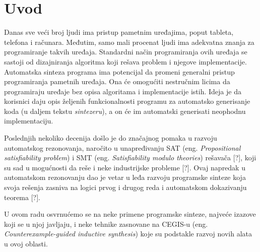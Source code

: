 \section{Uvod}
\label{sec:uvod}

Danas sve veći broj ljudi ima pristup pametnim uređajima, poput tableta, telefona i računara. Međutim, samo mali procenat ljudi ima adekvatna znanja za programiranje takvih uređaja. Standardni način programiranja ovih uređaja se sastoji od dizajniranja algoritma koji rešava problem i njegove implementacije. Automatska sinteza programa ima potencijal da promeni generalni pristup programiranja pametnih uređaja. Ona će omogućiti nestručnim licima da programiraju uređaje bez opisa algoritama i implementacije istih. Ideja je da korisnici daju opis željenih funkcionalnosti programu za automatsko generisanje koda (u daljem tekstu \emph{sintezeru}), a on će im automatski generisati neophodnu implementaciju.

Poslednjih nekoliko decenija došlo je do značajnog pomaka u razvoju automatskog rezonovanja, naročito u unapređivanju SAT (eng. \emph{Propositional satisfiability problem}) i SMT (eng. \emph{Satisfiability modulo theories}) rešavača [?], koji su sad u mogućnosti da reše i neke industrijske probleme [?]. Ovaj napredak u automatskom rezonovanju dao je vetar u leđa razvoju programske sinteze koja svoja rešenja zasniva na logici prvog i drugog reda i automatskom dokazivanju teorema [?].

U ovom radu osvrnućemo se na neke primene programske sinteze, najveće izazove koji se u njoj javljaju, i neke tehnike zasnovane na CEGIS-u (eng. \emph{Counterexample-guided inductive synthesis}) koje su podstakle razvoj novih alata u ovoj oblasti.
